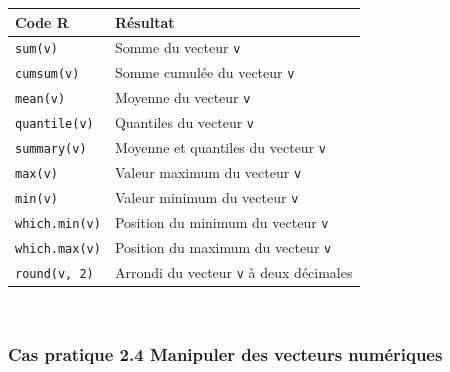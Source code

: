 \documentclass[12pt,twosided, notitlepage]{book}
\begin{document}
\begin{longtable}[]{@{}ll@{}}
\toprule
\textbf{Code R} & \textbf{Résultat}\tabularnewline
\midrule
\endhead
\texttt{sum(v)}\index{\texttt{sum}|textbf} & Somme du vecteur
\texttt{v}\tabularnewline
\texttt{cumsum(v)}\index{\texttt{cumsum}|textbf} & Somme cumulée du
vecteur \texttt{v}\tabularnewline
\texttt{mean(v)}\index{\texttt{mean}|textbf} & Moyenne du vecteur
\texttt{v}\tabularnewline
\texttt{quantile(v)}\index{\texttt{quantile}|textbf} & Quantiles du
vecteur \texttt{v}\tabularnewline
\texttt{summary(v)}\index{\texttt{summary}|textbf} & Moyenne et
quantiles du vecteur \texttt{v}\tabularnewline
\texttt{max(v)}\index{\texttt{max}|textbf} & Valeur maximum du vecteur
\texttt{v}\tabularnewline
\texttt{min(v)}\index{\texttt{min}|textbf} & Valeur minimum du vecteur
\texttt{v}\tabularnewline
\texttt{which.min(v)}\index{\texttt{which.min}|textbf} & Position du
minimum du vecteur \texttt{v}\tabularnewline
\texttt{which.max(v)}\index{\texttt{which.max}|textbf} & Position du
maximum du vecteur \texttt{v}\tabularnewline
\texttt{round(v,\ 2)}\index{\texttt{round}|textbf} & Arrondi du vecteur
\texttt{v} à deux décimales\tabularnewline
\bottomrule
\end{longtable}

~

\subsubsection{\texorpdfstring{\textbf{Cas pratique 2.4} Manipuler des
vecteurs
numériques}{Cas pratique 2.4 Manipuler des vecteurs numériques}}\label{cas-pratique-2.4-manipuler-des-vecteurs-numeriques}

\end{document}
